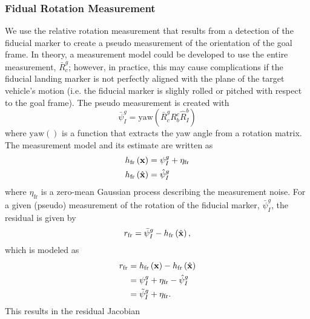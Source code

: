 \subsubsection{Fidual Rotation Measurement}
We use the relative rotation measurement that results from a detection of the
fiducial marker
to create a pseudo measurement of the orientation of the goal frame. In theory,
a measurement model could be developed to use the entire measurement,
$\bar{R}_c^g$; however, in practice, this may cause complications if the
fiducial landing marker is not perfectly aligned with the plane of the target
vehicle's motion (i.e. the fiducial marker is slighly rolled or pitched with
respect to the goal frame).
The pseudo
measurement is created with
\begin{equation}
  \bar{\psi}_I^g = \text{yaw} \left( \bar{R}_c^g R_b^c \hat{R}_I^b \right)
\end{equation}
where $\text{yaw}\left(\right)$ is a function that extracts the yaw angle
from a rotation matrix.
The measurement model and its estimate are
written as
\begin{align}
  h_{\text{fr}} \left( \boldsymbol{\mathrm{x}} \right) &= \psi_I^g + \eta_{\text{fr}} \\
  h_{\text{fr}} \left( \hat{\boldsymbol{\mathrm{x}}} \right) &= \hat{\psi}_I^g
\end{align}
where $\eta_{\text{fr}}$ is a zero-mean Gaussian process describing the
measurement noise.
For a given (pseudo) measurement of the rotation of the fiducial marker,
$\bar{\psi}_I^g$,
the residual is given by
\begin{equation}
  r_{\text{fr}} = \bar{\psi}_I^g - h_{\text{fr}} \left( \hat{\boldsymbol{\mathrm{x}}} \right),
\end{equation}
which is modeled as
\begin{align}
  r_{\text{fr}} &= h_{\text{fr}} \left( \boldsymbol{\mathrm{x}} \right) - h_{\text{fr}} \left( \hat{\boldsymbol{\mathrm{x}}} \right) \\
                &= \psi_I^g + \eta_{\text{fr}} - \hat{\psi}_I^g \\
                &= \tilde{\psi}_I^g + \eta_{\text{fr}}.
\end{align}
This results in the residual Jacobian
